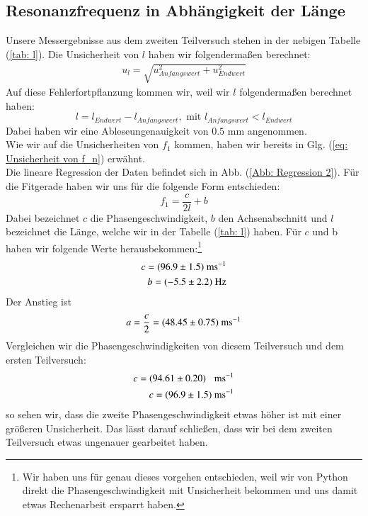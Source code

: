 \documentclass[bibliography=totocnumbered]{scrartcl}
\begin{document}
	\subsection{Resonanzfrequenz in Abhängigkeit der Länge}
	
	Unsere Messergebnisse aus dem zweiten Teilversuch stehen in der nebigen Tabelle (\ref{tab: l}). Die Unsicherheit von $ l $ haben wir folgendermaßen berechnet: 
	\begin{align}\label{eq: l unsicherheit}
		u_{l}=\sqrt{u_{Anfangswert}^{2}+u_{Endwert}^{2}}
	\end{align}
Auf diese Fehlerfortpflanzung kommen wir, weil wir $ l $ folgendermaßen berechnet haben:
\begin{equation}\label{eq: Länge}
	l=l_{Endwert}-l_{Anfangswert},\text{ mit } l_{Anfangswert}<l_{Endwert}
\end{equation}
Dabei haben wir eine Ableseungenauigkeit von $ 0.5 $ mm angenommen.\\
Wie wir auf die Unsicherheiten von $ f_{1} $ kommen, haben wir bereits in Glg. (\ref{eq: Unsicherheit von f_n}) erwähnt.\\
Die lineare Regression der Daten befindet sich in Abb. (\ref{Abb: Regression 2}). Für die Fitgerade haben wir uns für die folgende Form entschieden:
\begin{equation}\label{eq: Regression 2}
	f_{1}=\dfrac{c}{2l}+b
\end{equation}
	Dabei bezeichnet $ c $ die Phasengeschwindigkeit, $ b $ den Achsenabschnitt und $ l $ bezeichnet die Länge, welche wir in der Tabelle  (\ref{tab: l}) haben. Für $ c $ und b haben wir folgende Werte herausbekommen:\footnote{Wir haben uns für genau dieses vorgehen entschieden, weil wir von Python direkt die Phasengeschwindigkeit mit Unsicherheit bekommen und uns damit etwas Rechenarbeit ersparrt haben.}
	\begin{align}
		c=(96.9\pm 1.5)\text{ ms$ ^{-1} $}\\
		b=(-5.5\pm 2.2) \text{ Hz}
	\end{align}
Der Anstieg ist \begin{equation}
	a=\dfrac{c}{2}=(48.45\pm 0.75)\text{ ms$ ^{-1} $}
\end{equation}
Vergleichen wir die Phasengeschwindigkeiten von diesem Teilversuch und dem ersten Teilversuch:
\begin{align}\label{eq: Vergleich}
		c=(94.61\pm0.20) \hspace{3mm} \text{ms$ ^{-1} $}\\
		c=(96.9\pm 1.5)\text{ ms$ ^{-1} $}
\end{align}
so sehen wir, dass die zweite Phasengeschwindigkeit etwas höher ist mit einer größeren Unsicherheit. Das lässt darauf schließen, dass wir bei dem zweiten Teilversuch etwas ungenauer gearbeitet haben.
\newpage
\end{document}

